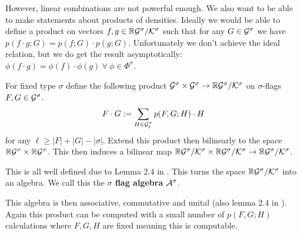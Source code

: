 However, linear combinations are not powerful enough. We also want to be able to make
statements about products of densities. Ideally we would be able to define a
product on vectors $f, g \in \mathbb{R}\mathcal{G}^\sigma / \mathcal{K}^\sigma$ such that for any $G\in\mathcal{G}^\sigma$
we have $p(f \cdot g; G) = p(f; G)\cdot p(g; G)$. Unfortunately we don't achieve the
ideal relation, but we do get the result asymptotically:
$\phi(f\cdot g) = \phi(f) \cdot \phi(g)\ \forall\ \phi\in\Phi^\sigma$.

\begin{definition}
    For fixed type $\sigma$ define the following product $\mathcal{G}^\sigma \times \mathcal{G}^\sigma \to \mathbb{R}\mathcal{G}^\sigma / \mathcal{K}^\sigma$
    on $\sigma$-flags $F, G\in\mathcal{G}^\sigma$.
    \[
        F \cdot G := \sum_{H \in \mathcal{G}^\sigma_\ell} p(F, G; H) \cdot H
    \]
    for any $\ell \geq |F|+|G|-|\sigma|$.
    Extend this product then bilinearly to the space
    $\mathbb{R}\mathcal{G}^\sigma \times \mathbb{R}\mathcal{G}^\sigma$. This then induces a bilinear map
    $\mathbb{R}\mathcal{G}^\sigma / \mathcal{K}^\sigma \times \mathbb{R}\mathcal{G}^\sigma / \mathcal{K}^\sigma \to \mathbb{R}\mathcal{G}^\sigma / \mathcal{K}^\sigma$.

    This is all well defined due to Lemma 2.4 in \cite{razborovFlagAlgebras2007}.
    This turns the space
    $\mathbb{R}\mathcal{G}^\sigma / \mathcal{K}^\sigma$ into an algebra. We call this the
    \textbf{$\sigma$ flag algebra} $\mathcal{A}^\sigma$.

\end{definition}

This algebra is then associative, commutative and unital
(also lemma 2.4 in \cite{razborovFlagAlgebras2007}). Again this product can be computed
with a small number of $p(F, G; H)$ calculations where $F, G, H$ are fixed meaning this
is computable.

